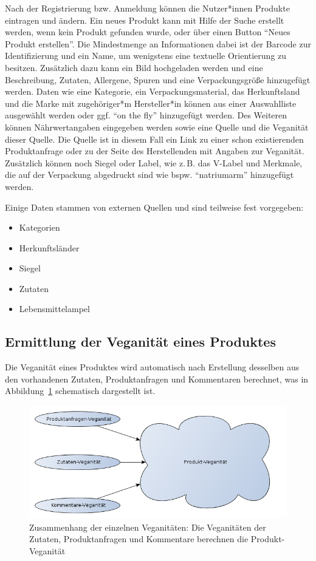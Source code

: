 Nach der Registrierung bzw. Anmeldung können die Nutzer*innen Produkte
eintragen und ändern.
Ein neues Produkt kann mit Hilfe der Suche erstellt werden, wenn kein
Produkt gefunden wurde, oder über einen Button "`Neues Produkt
erstellen"'.
Die Mindestmenge an Informationen dabei ist der Barcode zur
Identifizierung und ein Name, um wenigstens eine textuelle
Orientierung zu besitzen.
Zusätzlich dazu kann ein Bild hochgeladen werden und eine Beschreibung,
Zutaten, Allergene, Spuren und eine Verpackungsgröße hinzugefügt
werden. Daten wie eine Kategorie, ein Verpackungsmaterial, das
Herkunftsland und die Marke mit zugehöriger*m Hersteller*in können aus einer Auswahlliste ausgewählt
werden oder ggf. "`on the fly"' hinzugefügt werden.
Des Weiteren
können Nährwertangaben eingegeben werden sowie eine Quelle und die
Veganität dieser Quelle. Die Quelle ist in diesem Fall ein Link zu einer schon
existierenden Produktanfrage oder zu der Seite des Herstellenden mit
Angaben zur Veganität.
Zusätzlich können noch Siegel oder Label, wie
z.\,B. das V-Label  und Merkmale, die auf der
Verpackung abgedruckt sind wie bspw. "`natriumarm"' hinzugefügt
werden.

Einige Daten stammen von externen Quellen und sind teilweise fest
vorgegeben:

\begin{itemize}
	\item Kategorien 
	\item Herkunftsländer 
	\item Siegel 
	\item Zutaten 
	\item Lebensmittelampel 
\end{itemize}

\subsection{Ermittlung der Veganität eines Produktes}
\label{sec:concept:veganity}

Die Veganität eines Produktes wird automatisch nach Erstellung
desselben
aus den vorhandenen Zutaten, Produktanfragen und Kommentaren
berechnet, was in Abbildung~\ref{img:veganity} schematisch dargestellt ist.

\begin{figure}[ht]
  \centering
  \includegraphics[scale=0.5]{misc/veganity.png}
  \caption{Zusammenhang der einzelnen Veganitäten: Die Veganitäten der Zutaten, 
Produktanfragen und Kommentare berechnen die Produkt-Veganität}
  \label{img:veganity}
\end{figure}

